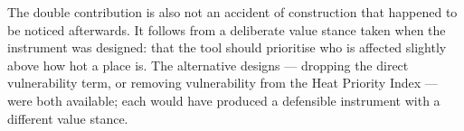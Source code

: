 The double contribution is also not an accident of construction that happened
to be noticed afterwards. It follows from a deliberate value stance taken when
the instrument was designed: that the tool should prioritise who is affected
slightly above how hot a place is. The alternative designs --- dropping
the direct vulnerability term, or removing vulnerability from the Heat Priority
Index --- were both available; each would have produced a defensible instrument
with a different value stance.
